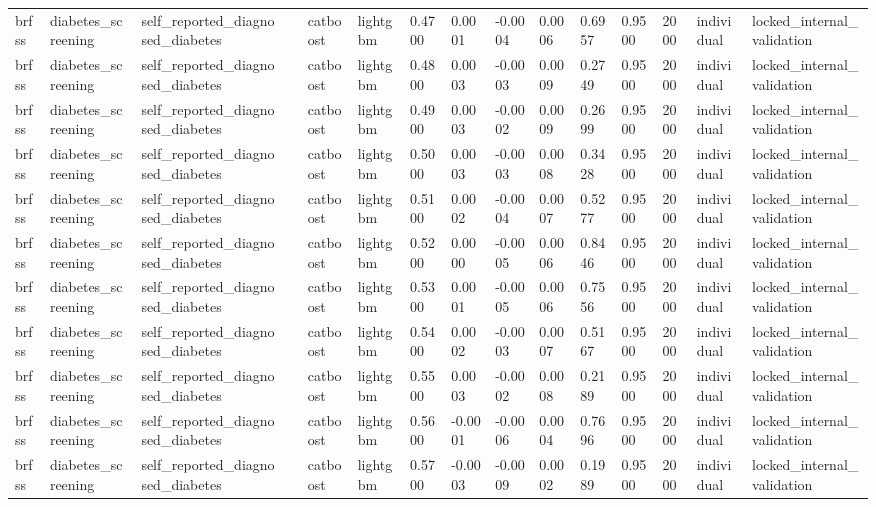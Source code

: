 \begin{tabular}{lllllllllllllll}
brfss & diabetes\_screening & self\_reported\_diagnosed\_diabetes &  & catboost & lightgbm & 0.4700 & 0.0001 & -0.0004 & 0.0006 & 0.6957 & 0.9500 & 2000 & individual & locked\_internal\_validation \\
brfss & diabetes\_screening & self\_reported\_diagnosed\_diabetes &  & catboost & lightgbm & 0.4800 & 0.0003 & -0.0003 & 0.0009 & 0.2749 & 0.9500 & 2000 & individual & locked\_internal\_validation \\
brfss & diabetes\_screening & self\_reported\_diagnosed\_diabetes &  & catboost & lightgbm & 0.4900 & 0.0003 & -0.0002 & 0.0009 & 0.2699 & 0.9500 & 2000 & individual & locked\_internal\_validation \\
brfss & diabetes\_screening & self\_reported\_diagnosed\_diabetes &  & catboost & lightgbm & 0.5000 & 0.0003 & -0.0003 & 0.0008 & 0.3428 & 0.9500 & 2000 & individual & locked\_internal\_validation \\
brfss & diabetes\_screening & self\_reported\_diagnosed\_diabetes &  & catboost & lightgbm & 0.5100 & 0.0002 & -0.0004 & 0.0007 & 0.5277 & 0.9500 & 2000 & individual & locked\_internal\_validation \\
brfss & diabetes\_screening & self\_reported\_diagnosed\_diabetes &  & catboost & lightgbm & 0.5200 & 0.0000 & -0.0005 & 0.0006 & 0.8446 & 0.9500 & 2000 & individual & locked\_internal\_validation \\
brfss & diabetes\_screening & self\_reported\_diagnosed\_diabetes &  & catboost & lightgbm & 0.5300 & 0.0001 & -0.0005 & 0.0006 & 0.7556 & 0.9500 & 2000 & individual & locked\_internal\_validation \\
brfss & diabetes\_screening & self\_reported\_diagnosed\_diabetes &  & catboost & lightgbm & 0.5400 & 0.0002 & -0.0003 & 0.0007 & 0.5167 & 0.9500 & 2000 & individual & locked\_internal\_validation \\
brfss & diabetes\_screening & self\_reported\_diagnosed\_diabetes &  & catboost & lightgbm & 0.5500 & 0.0003 & -0.0002 & 0.0008 & 0.2189 & 0.9500 & 2000 & individual & locked\_internal\_validation \\
brfss & diabetes\_screening & self\_reported\_diagnosed\_diabetes &  & catboost & lightgbm & 0.5600 & -0.0001 & -0.0006 & 0.0004 & 0.7696 & 0.9500 & 2000 & individual & locked\_internal\_validation \\
brfss & diabetes\_screening & self\_reported\_diagnosed\_diabetes &  & catboost & lightgbm & 0.5700 & -0.0003 & -0.0009 & 0.0002 & 0.1989 & 0.9500 & 2000 & individual & locked\_internal\_validation \\

\end{tabular}
